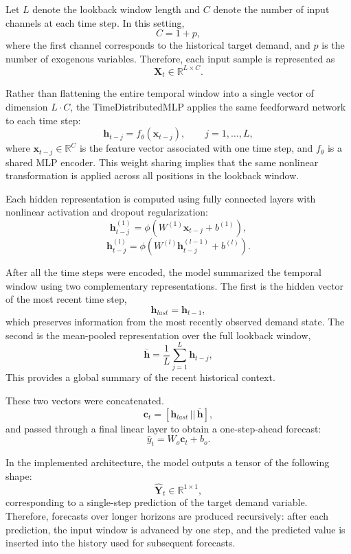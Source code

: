 Let \(L\) denote the lookback window length and \(C\) denote the number of input channels at each time step. In this setting,
\[
C = 1 + p,
\]
where the first channel corresponds to the historical target demand, and \(p\) is the number of exogenous variables. Therefore, each input sample is represented as
\[
\mathbf{X}_t \in \mathbb{R}^{L \times C}.
\]

Rather than flattening the entire temporal window into a single vector of dimension \(L \cdot C\), the TimeDistributedMLP applies the same feedforward network to each time step:
\[
\mathbf{h}_{t-j} = f_{\theta}(\mathbf{x}_{t-j}), 
\qquad j = 1,\ldots,L,
\]
where \(\mathbf{x}_{t-j} \in \mathbb{R}^{C}\) is the feature vector associated with one time step, and \(f_{\theta}\) is a shared MLP encoder. This weight sharing implies that the same nonlinear transformation is applied across all positions in the lookback window.

Each hidden representation is computed using fully connected layers with nonlinear activation and dropout regularization:
\[
\mathbf{h}^{(1)}_{t-j} = \phi(W^{(1)}\mathbf{x}_{t-j} + b^{(1)}),
\]
\[
\mathbf{h}^{(l)}_{t-j} = \phi(W^{(l)}\mathbf{h}^{(l-1)}_{t-j} + b^{(l)}).
\]

After all the time steps were encoded, the model summarized the temporal window using two complementary representations. The first is the hidden vector of the most recent time step,
\[
\mathbf{h}_{last} = \mathbf{h}_{t-1},
\]
which preserves information from the most recently observed demand state. The second is the mean-pooled representation over the full lookback window,
\[
\bar{\mathbf{h}} = \frac{1}{L}\sum_{j=1}^{L}\mathbf{h}_{t-j},
\]
This provides a global summary of the recent historical context.

These two vectors were concatenated.
\[
\mathbf{c}_t = [\mathbf{h}_{last} \, || \, \bar{\mathbf{h}}],
\]
and passed through a final linear layer to obtain a one-step-ahead forecast:
\[
\hat{y}_{t} = W_o \mathbf{c}_t + b_o.
\]

In the implemented architecture, the model outputs a tensor of the following shape:
\[
\hat{\mathbf{Y}}_t \in \mathbb{R}^{1 \times 1},
\]
corresponding to a single-step prediction of the target demand variable. Therefore, forecasts over longer horizons are produced recursively: after each prediction, the input window is advanced by one step, and the predicted value is inserted into the history used for subsequent forecasts.

